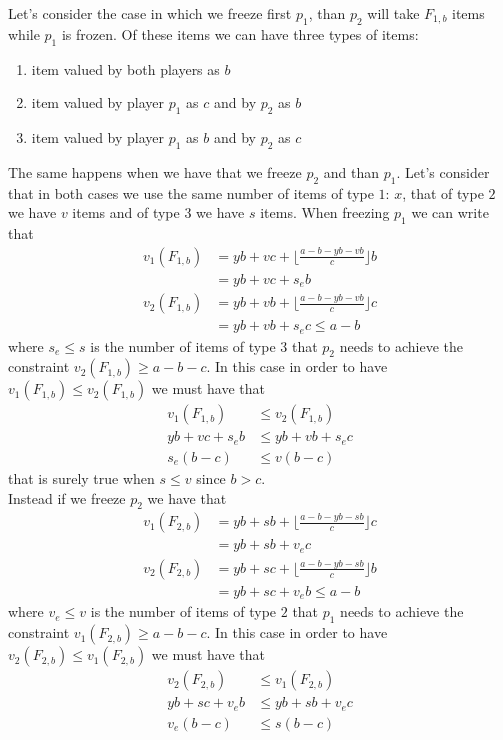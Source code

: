 \documentclass{article}
\begin{document}
Let's consider the case in which we freeze first $p_1$, than $p_2$ will take $F_{1,b}$ items while $p_1$ is frozen. Of these items we can have three types of items: 
\begin{enumerate}
    \item item valued by both players as $b$
    \item item valued by player $p_1$ as $c$ and by $p_2$ as $b$
    \item item valued by player $p_1$ as $b$ and by $p_2$ as $c$
\end{enumerate}
The same happens when we have that we freeze $p_2$ and than $p_1$. Let's consider that in both cases we use the same number of items of type $1$: $x$, that of type $2$ we have $v$ items and of type $3$ we have $s$ items. 
When freezing $p_1$ we can write that 
\begin{align}
    v_1(F_{1,b}) &= yb + vc + \lfloor \frac{a-b-yb-vb}{c}\rfloor b \\
                & = yb + vc + s_e b\\
    v_2(F_{1,b}) &= yb + vb + \lfloor \frac{a-b-yb-vb}{c}\rfloor c \\
                & = yb + vb + s_e c \le a-b
\end{align}
where $s_e\le s$ is the number of items of type $3$ that $p_2$ needs to achieve the constraint $v_2(F_{1,b})\ge a-b-c$. In this case in order to have $v_1(F_{1,b}) \le v_2(F_{1,b})$ we must have that
\begin{align*}
    v_1(F_{1,b}) &\le v_2(F_{1,b})\\
    yb + vc + s_e b &\le yb + vb + s_e c\\
    s_e(b-c) &\le v(b-c)
\end{align*}
that is surely true when $s\le v$ since $b> c$.\\
Instead if we freeze $p_2$ we have that
\begin{align}
    v_1(F_{2,b}) &= yb + sb + \lfloor \frac{a-b-yb-sb}{c}\rfloor c \\
                & = yb + sb + v_e c\\
    v_2(F_{2,b}) &= yb + sc + \lfloor \frac{a-b-yb-sb}{c}\rfloor b \\
                & = yb + sc + v_e b \le a-b
\end{align}
where $v_e\le v$ is the number of items of type $2$ that $p_1$ needs to achieve the constraint $v_1(F_{2,b})\ge a-b-c$. In this case in order to have $v_2(F_{2,b}) \le v_1(F_{2,b})$ we must have that
\begin{align*}
    v_2(F_{2,b}) &\le v_1(F_{2,b})\\
    yb + sc + v_e b &\le yb + sb + v_e c\\
    v_e(b-c) &\le s(b-c)
\end{align*}
\end{document}
